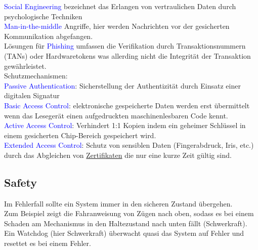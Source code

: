 \documentclass[a4paper,12pt,leqno]{article}
\newcommand{\blue}[1]{\textcolor{blue}{#1}}
\begin{document}
\blue{Social Engineering} bezeichnet das Erlangen von vertraulichen Daten durch psychologische Techniken\\
\blue{Man-in-the-middle} Angriffe, hier werden Nachrichten vor der gesicherten Kommunikation abgefangen.\\
Lösungen für \blue{Phishing} umfassen die Verifikation durch Transaktionsnummern (TANs) oder Hardwaretokens was allerding nicht die Integrität der Transaktion gewährleistet.\\
Schutzmechanismen:\\
\blue{Passive Authentication}: Sicherstellung der Authentizität durch Einsatz einer digitalen Signatur\\
\blue{Basic Access Control}: elektronische gespeicherte Daten werden erst übermittelt wenn das Lesegerät einen aufgedruckten maschinenlesbaren Code kennt.\\
\blue{Active Access Control}: Verhindert 1:1 Kopien indem ein geheimer Schlüssel in einem gesicherten Chip-Bereich gespeichert wird.\\
\blue{Extended Access Control}: Schutz von sensiblen Daten (Fingerabdruck, Iris, etc.) durch das Abgleichen von \href{https://en.wikipedia.org/wiki/Extended_Access_Control}{Zertifikaten} die nur eine kurze Zeit gültig sind.

\subsection{Safety}
Im Fehlerfall sollte ein System immer in den sicheren Zustand übergehen.\\
Zum Beispiel zeigt die Fahranweisung von Zügen nach oben, sodass es bei einem Schaden am Mechanismus in den Haltezustand nach unten fällt (Schwerkraft). Ein Watchdog (hier Schwerkraft) überwacht quasi das System auf Fehler und resettet es bei einem Fehler.
\end{document}
